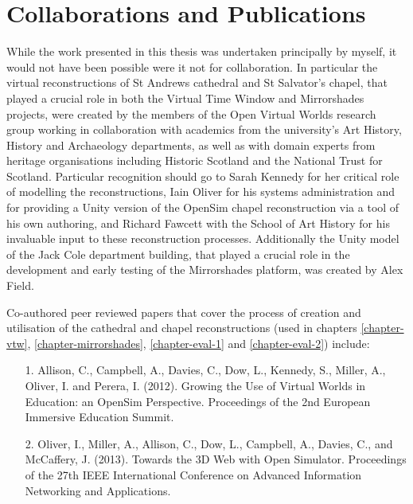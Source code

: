 \section{Collaborations and Publications}
\label{collaborations-and-publications}
While the work presented in this thesis was undertaken principally by myself, it would not have been possible were it not for collaboration. In particular the virtual reconstructions of St Andrews cathedral and St Salvator's chapel, that played a crucial role in both the Virtual Time Window and Mirrorshades projects, were created by the members of the Open Virtual Worlds research group working in collaboration with academics from the university's Art History, History and Archaeology departments, as well as with domain experts from heritage organisations including Historic Scotland and the National Trust for Scotland. Particular recognition should go to Sarah Kennedy for her critical role of modelling the reconstructions, Iain Oliver for his systems administration and for providing a Unity version of the OpenSim chapel reconstruction via a tool of his own authoring, and Richard Fawcett with the School of Art History for his invaluable input to these reconstruction processes. Additionally the Unity model of the Jack Cole department building, that played a crucial role in the development and early testing of the Mirrorshades platform, was created by Alex Field.


Co-authored peer reviewed papers that cover the process of creation and utilisation of the cathedral and chapel reconstructions (used in chapters \ref{chapter-vtw}, \ref{chapter-mirrorshades}, \ref{chapter-eval-1} and \ref{chapter-eval-2}) include:

\begin{itemize}

	\item [1.] Allison, C., Campbell, A., Davies, C., Dow, L., Kennedy, S., Miller, A., Oliver, I. and Perera, I. (2012). Growing the Use of Virtual Worlds in Education: an OpenSim Perspective. Proceedings of the 2nd European Immersive Education Summit.
	
	\item [2.] Oliver, I., Miller, A., Allison, C., Dow, L., Campbell, A., Davies, C., and McCaffery, J. (2013). Towards the 3D Web with Open Simulator. Proceedings of the 27th IEEE International Conference on Advanced Information Networking and Applications.

\end{itemize}

